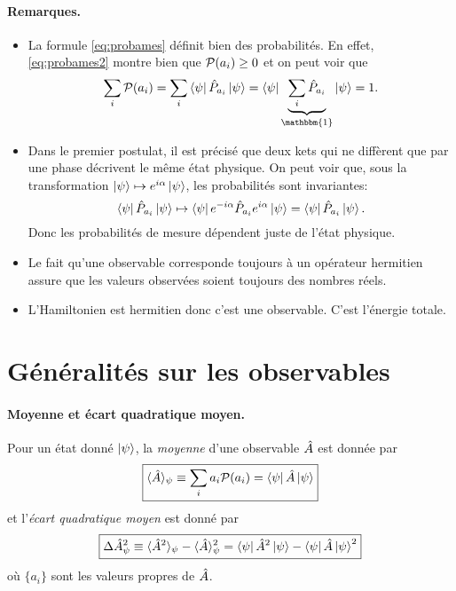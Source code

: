\documentclass[11pt,a4paper,oneside]{article}
\begin{document}
\paragraph{Remarques.}
\begin{itemize}[label=\tb]
    \item La formule \eqref{eq:probames} définit bien des probabilités. En effet, \eqref{eq:probames2} montre bien que $\P(a_i)\geq0$ et on peut voir que
    \begin{equation}
        \sum_i \P(a_i) = \sum_i \bra{\psi}\hP_{a_i}\kp{} = \bra{\psi}\underbrace{\sum_i\hP_{a_i}}_{\mathbbm{1}}\kp{} = 1.
    \end{equation} 
    \item Dans le premier postulat, il est précisé que deux kets qui ne diffèrent que par une phase décrivent le même état physique. On peut voir que, sous la transformation $\kp{}\mapsto e^{i\alpha}\kp{}$, les probabilités sont invariantes:
    \begin{equation}
        \bra{\psi}\hP_{a_i}\kp{} \mapsto \bra{\psi}e^{-i\alpha}\hP_{a_i}e^{i\alpha}\kp{} = \bra{\psi}\hP_{a_i}\kp{}.
    \end{equation}
    Donc les probabilités de mesure dépendent juste de l'état physique.
    \item Le fait qu'une observable corresponde toujours à un opérateur hermitien assure que les valeurs observées soient toujours des nombres réels.
    \item L'Hamiltonien est hermitien donc c'est une observable. C'est l'énergie totale.
\end{itemize}



\section{Généralités sur les observables}

\paragraph{Moyenne et écart quadratique moyen.} Pour un état donné $\ket{\psi}$, la \emph{moyenne} d'une observable $\hA$ est donnée par
\begin{equation}
    \boxed{\moy{\hA}_\psi \equiv \sum_i a_i\P(a_i) = \bra{\psi}\hA\ket{\psi}}
\end{equation}
et l'\emph{écart quadratique moyen} est donné par
\begin{equation}
    \boxed{\Delta\hA^2_\psi \equiv \moy{\hA^2}_\psi-\moy{\hA}_\psi^2 = \bra{\psi}\hA^2\ket{\psi}-\bra{\psi}\hA\ket{\psi}^2}
\end{equation}
où $\{a_i\}$ sont les valeurs propres de $\hA$.
\end{document}
